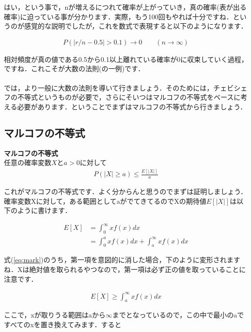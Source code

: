 \documentclass[11pt,a4paper,uplatex]{ujreport} 	%
\begin{document}
はい，という事で，nが増えるにつれて確率が上がっていき，真の確率(表が出る確率)に迫っている事が分かります．実際，もう100回もやれば十分ですね．というのが感覚的な説明でしたが，これを数式で表現すると以下のようになります．

\begin{align}
  P(|r/n -0.5| > 0.1) \longrightarrow 0\qquad(n\rightarrow\infty)
\end{align}

相対頻度が真の値である0.5から0.1以上離れている確率が0に収束していく過程，ですね．これこそが大数の法則(の一例)です．\\\\

では，より一般に大数の法則を導いて行きましょう．そのためには，チェビシェフの不等式というものが必要で，さらにそいつはマルコフの不等式をベースに考える必要があります．ということでまずはマルコフの不等式から行きましょう．

\subsection{マルコフの不等式}

\begin{screen}
  \textbf{マルコフの不等式}\\
  任意の確率変数$X$と$a>0$に対して
  \begin{align}
    P(|X| \geq a) \leq \frac{E[|X|]}{a}
  \end{align}
\end{screen}

これがマルコフの不等式です．よく分からんと思うのでまずは証明しましょう．確率変数Xに対して，ある範囲としてaがでてきてるのでXの期待値$E[|X|]$は以下のように書けます．

\begin{align}
  E[X] &= \int_0^\infty xf(x)dx \nonumber \\
  &= \int_0^a xf(x)dx + \int_a^\infty x f(x)dx
  \label{eq:mark}
\end{align}

式(\ref{eq:mark})のうち，第一項を意図的に消した場合，下のように変形されますね．Xは絶対値を取られるやつなので，第一項は必ず正の値を取っていることに注意です．

\begin{align}
  E[X] \geq \int_a^\infty x f(x)dx
\end{align}

ここで，xが取りうる範囲はaから$\infty$までとなっているので，この中で最小のaですべてのxを置き換えてみます．すると
\end{document}
